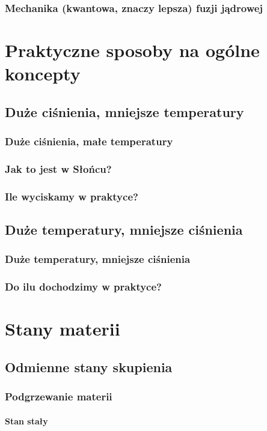 \documentclass{beamer}
\begin{document}
  \begin{frame}
    \frametitle{Mechanika (kwantowa, znaczy lepsza) fuzji jądrowej}
  \end{frame}

  \section{Praktyczne sposoby na ogólne koncepty}
  \subsection{Duże ciśnienia, mniejsze temperatury}
  \begin{frame}
    \frametitle{Duże ciśnienia, małe temperatury}
  \end{frame}

  \begin{frame}
    \frametitle{Jak to jest w Słońcu?}
  \end{frame}

  \begin{frame}
    \frametitle{Ile wyciskamy w praktyce?}
    \pause
  \end{frame}

  \subsection{Duże temperatury, mniejsze ciśnienia}
  \begin{frame}
    \frametitle{Duże temperatury, mniejsze ciśnienia}
  \end{frame}

  \begin{frame}
    \frametitle{Do ilu dochodzimy w praktyce?}
    \pause
    \pause
  \end{frame}

  \section{Stany materii}
  \subsection{Odmienne stany skupienia}
  \begin{frame}
    \frametitle{Podgrzewanie materii}
    \framesubtitle{Stan stały}
  \end{frame}
\end{document}
